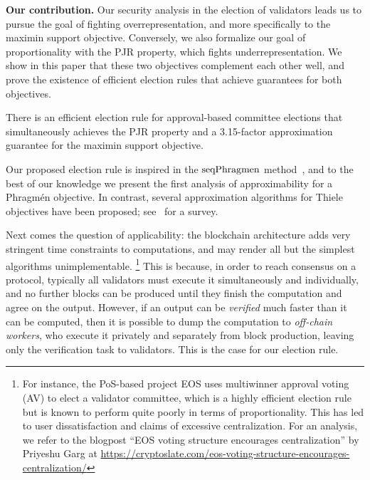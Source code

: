 \textbf{Our contribution.}
Our security analysis in the election of validators leads us to pursue the goal of fighting overrepresentation, and more specifically to the maximin support objective.  
Conversely, we also formalize our goal of proportionality with the PJR property, which fights underrepresentation. 
We show in this paper that these two objectives complement each other well, and prove the existence of efficient election rules that achieve guarantees for both objectives. 

\begin{theorem}\label{thm:intro1}
There is an efficient election rule for approval-based committee elections that simultaneously achieves the PJR property and a 3.15-factor approximation guarantee for the maximin support objective.
\end{theorem}

Our proposed election rule is inspired in the $\operatorname{seqPhragmen}$ method~\cite{brill2017phragmen}, and to the best of our knowledge we present the first analysis of approximability for a Phragm\'{e}n objective. 
In contrast, several approximation algorithms for Thiele objectives have been proposed; see~\cite{lackner2020approval} for a survey. 

Next comes the question of applicability: the blockchain architecture adds very stringent time constraints to computations, and may render all but the simplest algorithms unimplementable.%
%
\footnote{For instance, the PoS-based project EOS uses multiwinner approval voting (AV) to elect a validator committee, which is a highly efficient election rule but is known to perform quite poorly in terms of proportionality. This has led to user dissatisfaction and claims of excessive centralization. 
For an analysis, we refer to the blogpost ``EOS voting structure encourages centralization'' by Priyeshu Garg at \url{https://cryptoslate.com/eos-voting-structure-encourages-centralization/}} %
% 
This is because, in order to reach consensus on a protocol, typically all validators must execute it simultaneously and individually, and no further blocks can be produced until they finish the computation and agree on the output. 
However, if an output can be \emph{verified} much faster than it can be computed, then it is possible to dump the computation to \emph{off-chain workers}, who execute it privately and separately from block production, leaving only the verification task to validators. This is the case for our election rule.

